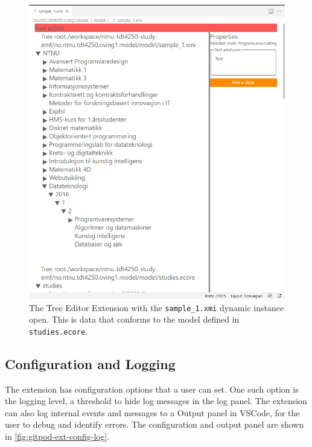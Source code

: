 \begin{figure}[H]  %
  \centering
  \includegraphics[width=\textwidth]{figures/gitpod-vscode-xmi-study-instance.png}
  \caption[Tree Editor Extension showing a dynamic instance]{The Tree Editor Extension with the \texttt{sample\_1.xmi} dynamic instance open. This is data that conforms to the model defined in \texttt{studies.ecore}.}\label{fig:gitpod-ext-dynamic}
\end{figure}


\subsection{Configuration and Logging}

The extension has configuration options that a user can set.
One such option is the logging level, a threshold to hide log messages in the log panel.
The extension can also log internal events and messages to a Output panel in \gls{VSCode}, for the user to debug and identify errors.
The configuration and output panel are shown in \cref{fig:gitpod-ext-config-log}.

